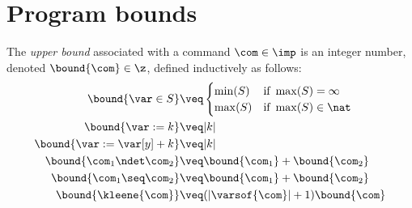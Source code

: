 \section{Program bounds}
\label{sec:bounds}

\begin{definition}
  \label{de:bound}
  The \emph{upper bound} associated with a command \(\com\in \imp\) is
  an integer number, denoted \(\bound{\com}\in \z\), defined
  inductively as follows:
  \begin{align*}
    \bound{\var \in S}  
    & \veq \begin{cases}
      \min(S) & \text{if } \max(S)=\infty\\
      \max(S) & \text{if } \max(S)\in \nat
    \end{cases}
    \\
    \bound{\var := k} 
    & \veq | k |\\
    \bound{\var := \var[y] + k}
    & \veq | k |\\
    \bound{\com_1 \ndet \com_2}
    & \veq \bound{\com_1} + \bound{\com_2}\\
    \bound{\com_1 \seq \com_2}
    & \veq \bound{\com_1} + \bound{\com_2}\\
    \bound{\kleene{\com}}
    & \veq (|\varsof{\com}|+1) \bound{\com} \\ 
  \end{align*}


\end{definition}
